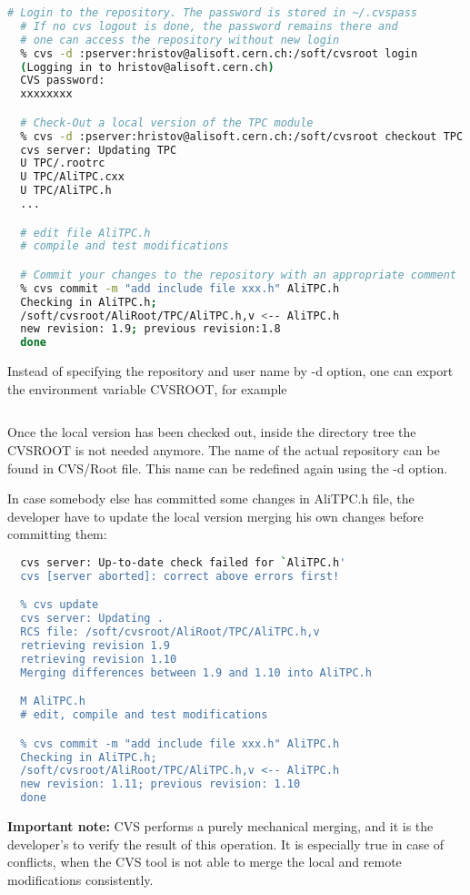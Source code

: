 \documentclass[12pt,a4paper,twoside]{article}
\begin{document}
\begin{lstlisting}[language=sh]
  # Login to the repository. The password is stored in ~/.cvspass
  # If no cvs logout is done, the password remains there and
  # one can access the repository without new login 
  % cvs -d :pserver:hristov@alisoft.cern.ch:/soft/cvsroot login
  (Logging in to hristov@alisoft.cern.ch)
  CVS password:
  xxxxxxxx

  # Check-Out a local version of the TPC module
  % cvs -d :pserver:hristov@alisoft.cern.ch:/soft/cvsroot checkout TPC
  cvs server: Updating TPC
  U TPC/.rootrc
  U TPC/AliTPC.cxx
  U TPC/AliTPC.h
  ...

  # edit file AliTPC.h
  # compile and test modifications

  # Commit your changes to the repository with an appropriate comment
  % cvs commit -m "add include file xxx.h" AliTPC.h
  Checking in AliTPC.h;
  /soft/cvsroot/AliRoot/TPC/AliTPC.h,v <-- AliTPC.h
  new revision: 1.9; previous revision:1.8
  done

\end{lstlisting}

Instead of specifying the repository and user name by -d option, one
can export the environment variable CVSROOT, for example

\begin{lstlisting}[language=sh]
  % export CVSROOT=:pserver:hristov@alisoft.cern.ch:/soft/cvsroot
\end{lstlisting}

Once the local version has been checked out, inside the directory tree
the CVSROOT is not needed anymore. The name of the actual repository
can be found in CVS/Root file. This name can be redefined again using
the -d option.

In case somebody else has committed some changes in AliTPC.h file, the
developer have to update the local version merging his own changes
before committing them:

\begin{lstlisting}[language=sh]
  % cvs commit -m "add include file xxx.h" AliTPC.h
  cvs server: Up-to-date check failed for `AliTPC.h'
  cvs [server aborted]: correct above errors first!

  % cvs update
  cvs server: Updating .
  RCS file: /soft/cvsroot/AliRoot/TPC/AliTPC.h,v
  retrieving revision 1.9
  retrieving revision 1.10
  Merging differences between 1.9 and 1.10 into AliTPC.h

  M AliTPC.h
  # edit, compile and test modifications

  % cvs commit -m "add include file xxx.h" AliTPC.h
  Checking in AliTPC.h;
  /soft/cvsroot/AliRoot/TPC/AliTPC.h,v <-- AliTPC.h
  new revision: 1.11; previous revision: 1.10
  done

\end{lstlisting}
\textbf{Important note:} CVS performs a purely mechanical merging, and
it is  the developer's to verify  the result of this  operation. It is
especially true in case of conflicts, when the CVS tool is not able to
merge the local and remote modifications consistently.
\end{document}
